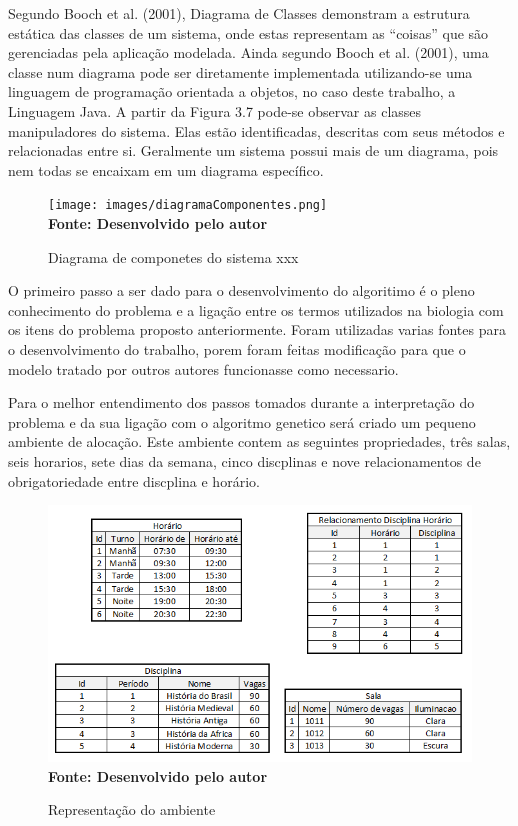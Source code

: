 \documentclass{abntpuc}
\begin{document}
Segundo Booch et al. (2001), Diagrama de Classes demonstram a estrutura estática
das classes de um sistema, onde estas representam as “coisas” que são gerenciadas pela
aplicação modelada. Ainda segundo Booch et al. (2001), uma classe num diagrama pode
ser diretamente implementada utilizando-se uma linguagem de programação orientada a
objetos, no caso deste trabalho, a Linguagem Java.
A partir da Figura 3.7 pode-se observar as classes manipuladores do sistema. Elas
estão identificadas, descritas com seus métodos e relacionadas entre si. Geralmente um
sistema possui mais de um diagrama, pois nem todas se encaixam em um diagrama
específico.

\begin{figure}[!htb]
\caption[Diagrama de componetes do sistema xxx]{Diagrama de componetes do sistema xxx}
\label{fig:figura3}
\centering
\texttt{[image: images/diagramaComponentes.png]}
\\ \textbf{\footnotesize Fonte: Desenvolvido pelo autor}
\end{figure}



O primeiro passo a ser dado para o desenvolvimento do algoritimo é o pleno conhecimento do problema e a ligação entre os termos utilizados na biologia com os itens do problema proposto anteriormente. Foram utilizadas varias fontes para o desenvolvimento do trabalho, porem foram feitas modificação para que o modelo tratado por outros autores funcionasse como necessario.\par

Para o melhor entendimento dos passos tomados durante a interpretação do problema e da sua ligação com o algoritmo genetico será criado um pequeno ambiente de alocação. Este ambiente contem as seguintes propriedades, três salas, seis horarios, sete dias da semana, cinco discplinas e nove relacionamentos de obrigatoriedade entre discplina e horário.\par

\begin{figure}[!htb]
\caption[Representação do ambiente]{Representação do ambiente}
\label{fig:figura4}
\centering
\includegraphics[scale=0.8]{imagens/representacaoAmbiente.png}
\\ \textbf{\footnotesize Fonte: Desenvolvido pelo autor}
\end{figure}
\end{document}
